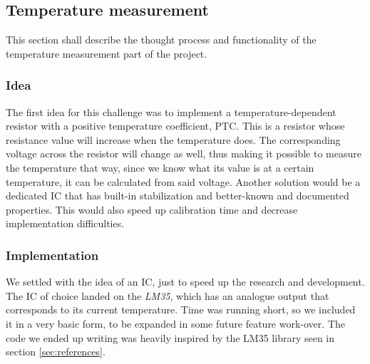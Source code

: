 \subsection{Temperature measurement}
\label{sec:method_temperature}
This section shall describe the thought process and functionality of the temperature measurement part of the project.

\subsubsection{Idea}
The first idea for this challenge was to implement a temperature-dependent resistor with a positive temperature coefficient, PTC. This is a resistor whose resistance value will increase when the temperature does. The corresponding voltage across the resistor will change as well, thus making it possible to measure the temperature that way, since we know what its value is at a certain temperature, it can be calculated from said voltage.
Another solution would be a dedicated IC that has built-in stabilization and better-known and documented properties. This would also speed up calibration time and decrease implementation difficulties.

\subsubsection{Implementation}
We settled with the idea of an IC, just to speed up the research and development. The IC of choice landed on the \textit{LM35}, which has an analogue output that corresponds to its current temperature. Time was running short, so we included it in a very basic form, to be expanded in some future feature work-over. The code we ended up writing was heavily inspired by the LM35 library seen in section \ref{sec:references}.